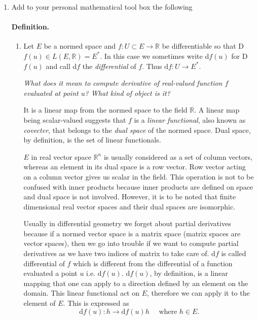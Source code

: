 \documentclass{article}
\begin{document}
\begin{enumerate}[start=9]
  \item Add to your personal mathematical tool box the following
  \paragraph{Definition.}

  \begin{enumerate}
    \item Let $E$ be a normed space and $f:U\subset E\rightarrow\mathbb{R}$ be differentiable so that D$f(u)\in L(E,\mathbb{R})=E^{*}$. In this case we sometimes write d$f(u)$ for D$f(u)$ and call d$f$ the \textit{differential} of $f$. Thus $\text{d}f:U\rightarrow E^{*}$.

    \begin{ans_box}
      \textit{What does it mean to compute derivative of real-valued function $f$ evaluated at point $u$? What kind of object is it?}\medskip

      It is a linear map from the normed space to the field $\mathbb{R}$. A linear map being scalar-valued suggests that $f$ is a \textit{linear functional}, also known as \textit{covecter}, that belongs to the \textit{dual space} of the normed space. Dual space, by definition, is the set of linear functionals.\medskip

      $E$ in real vector space $\mathbb{R}^{n}$ is usually considered as a set of column vectors, whereas an element in its dual space is a row vector. Row vector acting on a column vector gives us scalar in the field. This operation is not to be confused with inner products because inner products are defined on space and dual space is not involved. However, it is to be noted that finite dimensional real vector spaces and their dual spaces are isomorphic.\medskip

      Usually in differential geometry we forget about partial derivatives because if a normed vector space is a matrix space (matrix spaces are vector spaces), then we go into trouble if we want to compute partial derivatives as we have two indices of matrix to take care of. $\text{d}f$ is called differential of $f$ which is different from the differential of a function evaluated a point $u$ i.e. $\text{d}f(u)$. $\text{d}f(u)$, by definition, is a linear mapping that one can apply to a direction defined by an element on the domain. This linear functional act on $E$, therefore we can apply it to the element of $E$. This is expressed as $$\text{d}f(u):h\rightarrow \text{d}f(u)h\quad\text{ where }h\in E.$$


\end{ans_box}
\end{enumerate}
\end{enumerate}
\end{document}
